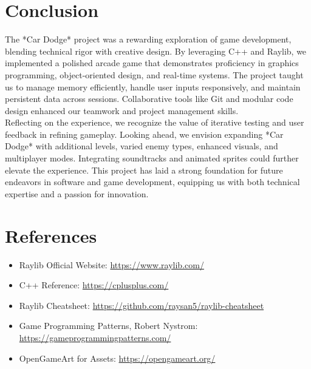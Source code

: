 \documentclass[12pt,a4paper]{article}
\begin{document}
\section{Conclusion}

The *Car Dodge* project was a rewarding exploration of game development, blending technical rigor with creative design. By leveraging C++ and Raylib, we implemented a polished arcade game that demonstrates proficiency in graphics programming, object-oriented design, and real-time systems. The project taught us to manage memory efficiently, handle user inputs responsively, and maintain persistent data across sessions. Collaborative tools like Git and modular code design enhanced our teamwork and project management skills. \\

Reflecting on the experience, we recognize the value of iterative testing and user feedback in refining gameplay. Looking ahead, we envision expanding *Car Dodge* with additional levels, varied enemy types, enhanced visuals, and multiplayer modes. Integrating soundtracks and animated sprites could further elevate the experience. This project has laid a strong foundation for future endeavors in software and game development, equipping us with both technical expertise and a passion for innovation. \\

\section{References}

\begin{itemize}
    \item Raylib Official Website: \url{https://www.raylib.com/}
    \item C++ Reference: \url{https://cplusplus.com/}
    \item Raylib Cheatsheet: \url{https://github.com/raysan5/raylib-cheatsheet}
    \item Game Programming Patterns, Robert Nystrom: \url{https://gameprogrammingpatterns.com/}
    \item OpenGameArt for Assets: \url{https://opengameart.org/}
\end{itemize}
\end{document}
